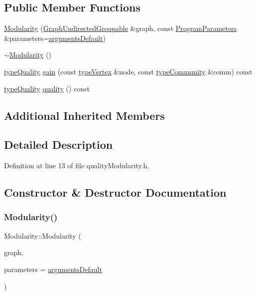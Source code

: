 \subsection*{Public Member Functions}
\begin{DoxyCompactItemize}
\item 
\hyperlink{classModularity_adb354c536b11b03d59eeb1d588294d40}{Modularity} (\hyperlink{classGraphUndirectedGroupable}{Graph\+Undirected\+Groupable} \&graph, const \hyperlink{structProgramParameters}{Program\+Parameters} \&parameters=\hyperlink{program_8h_ae2d819404495f80f31db7676c1329d19}{arguments\+Default})
\item 
\hyperlink{classModularity_a5f23716ff9c3d806e3a295c308dba5a9}{$\sim$\+Modularity} ()
\item 
\hyperlink{qualityInterface_8h_a15a3ec6041e6e02d00d2eff22c20fd94}{type\+Quality} \hyperlink{classModularity_afb4e750456a0138c2880e679df6d431d}{gain} (const \hyperlink{edge_8h_a5fbd20c46956d479cb10afc9855223f6}{type\+Vertex} \&node, const \hyperlink{graphUndirectedGroupable_8h_a914da95c9ea7f14f4b7f875c36818556}{type\+Community} \&comm) const
\item 
\hyperlink{qualityInterface_8h_a15a3ec6041e6e02d00d2eff22c20fd94}{type\+Quality} \hyperlink{classModularity_ab594c2c6ccde0e9467d7548923612c3a}{quality} () const
\end{DoxyCompactItemize}
\subsection*{Additional Inherited Members}


\subsection{Detailed Description}


Definition at line 13 of file quality\+Modularity.\+h.



\subsection{Constructor \& Destructor Documentation}
\mbox{\label{classModularity_adb354c536b11b03d59eeb1d588294d40}} 
\subsubsection{\texorpdfstring{Modularity()}{Modularity()}}
{\footnotesize\ttfamily Modularity\+::\+Modularity (\begin{DoxyParamCaption}\item[{\hyperlink{classGraphUndirectedGroupable}{Graph\+Undirected\+Groupable} \&}]{graph,  }\item[{const \hyperlink{structProgramParameters}{Program\+Parameters} \&}]{parameters = {\ttfamily \hyperlink{program_8h_ae2d819404495f80f31db7676c1329d19}{arguments\+Default}} }\end{DoxyParamCaption})\hspace{0.3cm}{\ttfamily [inline]}}

